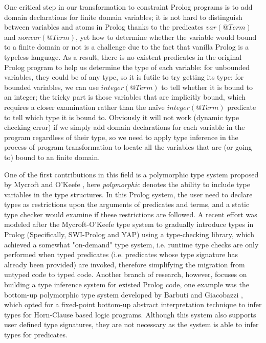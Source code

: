 \documentclass[12pt]{article}
\begin{document}
One critical step in our transformation to constraint Prolog programs is to add domain declarations for finite domain variables; it is not hard to distinguish between variables and atoms in Prolog thanks to the predicates $var(@Term)$ and $nonvar(@Term)$, yet how to determine whether the variable would bound to a finite domain or not is a challenge due to the fact that vanilla Prolog is a typeless language. As a result, there is no existent predicates in the original Prolog program to help us determine the type of each variable: for unbounded variables, they could be of any type, so it is futile to try getting its type; for bounded variables, we can use $integer(@Term)$ to tell whether it is bound to an integer; the tricky part is those variables that are implicitly bound, which requires a closer examination rather than the naïve $integer(@Term)$ predicate to tell which type it is bound to. Obviously it will not work (dynamic type checking error) if we simply add domain declarations for each variable in the program regardless of their type, so we need to apply type inference in the process of program transformation to locate all the variables that are (or going to) bound to an finite domain. 

One of the first contributions in this field is a polymorphic type system proposed by Mycroft and O'Keefe \cite{mycroft1984polymorphic}, here \emph{polymorphic} denotes the ability to include type variables in the type structures. In this Prolog system, the user need to declare types as restrictions upon the arguments of predicates and terms, and a static type checker would examine if these restrictions are followed. A recent effort was modeled after the Mycroft-O'Keefe type system to gradually introduce types in Prolog (Specifically, SWI-Prolog and YAP) using a type-checking library\cite{schrijvers2008towards}, which achieved a somewhat "on-demand" type system, i.e. runtime type checks are only performed when typed predicates (i.e. predicates whose type signature has already been provided) are invoked, therefore simplifying the migration from untyped code to typed code. Another branch of research, however, focuses on building a type inference system for existed Prolog code, one example was the bottom-up polymorphic type system developed by Barbuti and Giacobazzi \cite{barbuti1992bottom}, which opted for a fixed-point bottom-up abstract interpretation technique to infer types for Horn-Clause based logic programs. Although this system also supports user defined type signatures, they are not necessary as the system is able to infer types for predicates. 
\end{document}
